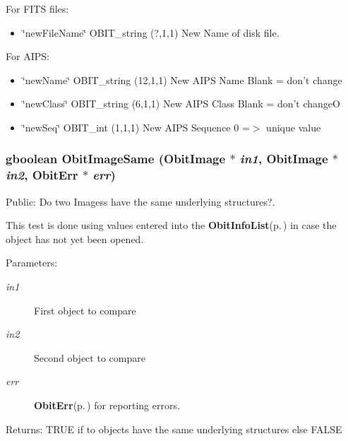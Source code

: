 For FITS files: \begin{itemize}
\item \char`\"{}new\-File\-Name\char`\"{} OBIT\_\-string (?,1,1) New Name of disk file.\end{itemize}
For AIPS: \begin{itemize}
\item \char`\"{}new\-Name\char`\"{} OBIT\_\-string (12,1,1) New AIPS Name Blank = don't change \item \char`\"{}new\-Class\char`\"{} OBIT\_\-string (6,1,1) New AIPS Class Blank = don't change\-O \item \char`\"{}new\-Seq\char`\"{} OBIT\_\-int (1,1,1) New AIPS Sequence 0 =$>$ unique value 
\end{itemize}
\subsubsection{\setlength{\rightskip}{0pt plus 5cm}gboolean Obit\-Image\-Same ({\bf Obit\-Image} $\ast$ {\em in1}, {\bf Obit\-Image} $\ast$ {\em in2}, {\bf Obit\-Err} $\ast$ {\em err})}\label{ObitImage_8h_a27}


Public: Do two Imagess have the same underlying structures?. 

This test is done using values entered into the {\bf Obit\-Info\-List}{\rm (p.\,\pageref{structObitInfoList})} in case the object has not yet been opened. \begin{Desc}
\item[Parameters:]
\begin{description}
\item[{\em in1}]First object to compare \item[{\em in2}]Second object to compare \item[{\em err}]{\bf Obit\-Err}{\rm (p.\,\pageref{structObitErr})} for reporting errors. \end{description}
\end{Desc}
\begin{Desc}
\item[Returns:]TRUE if to objects have the same underlying structures else FALSE \end{Desc}
